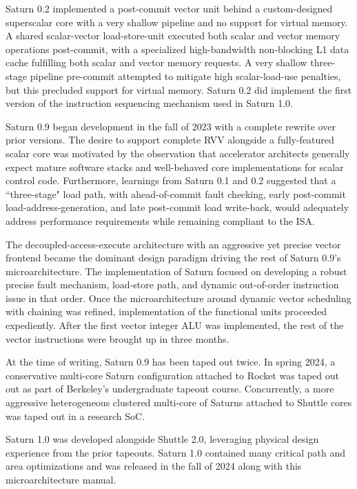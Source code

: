 Saturn 0.2 implemented a post-commit vector unit behind a custom-designed superscalar core with a very shallow pipeline and no support for virtual memory.
A shared scalar-vector load-store-unit executed both scalar and vector memory operations post-commit, with a specialized high-bandwidth non-blocking L1 data cache fulfilling both scalar and vector memory requests.
A very shallow three-stage pipeline pre-commit attempted to mitigate high scalar-load-use penalties, but this precluded support for virtual memory.
Saturn 0.2 did implement the first version of the instruction sequencing mechanism used in Saturn 1.0.

Saturn 0.9 began development in the fall of 2023 with a complete rewrite over prior versions.
The desire to support complete RVV alongside a fully-featured scalar core was motivated by the observation that accelerator architects generally expect mature software stacks and well-behaved core implementations for scalar control code.
Furthermore, learnings from Saturn 0.1 and 0.2 suggested that a ``three-stage" load path, with ahead-of-commit fault checking, early post-commit load-address-generation, and late post-commit load write-back, would adequately address performance requirements while remaining compliant to the ISA.

The decoupled-access-execute architecture with an aggressive yet precise vector frontend became the dominant design paradigm driving the rest of Saturn 0.9's microarchitecture.
The implementation of Saturn focused on developing a robust precise fault mechanism, load-store path, and dynamic out-of-order instruction issue in that order.
Once the microarchitecture around dynamic vector scheduling with chaining was refined, implementation of the functional units proceeded expediently.
After the first vector integer ALU was implemented, the rest of the vector instructions were brought up in three months.


At the time of writing, Saturn 0.9 has been taped out twice.
In spring 2024, a conservative multi-core Saturn configuration attached to Rocket was taped out out as part of Berkeley's undergraduate tapeout course.
Concurrently, a more aggressive heterogeneous clustered multi-core of Saturns attached to Shuttle cores was taped out in a research SoC.

Saturn 1.0 was developed alongside Shuttle 2.0, leveraging physical design experience from the prior tapeouts.
Saturn 1.0 contained many critical path and area optimizations and was released in the fall of 2024 along with this microarchitecture manual.

